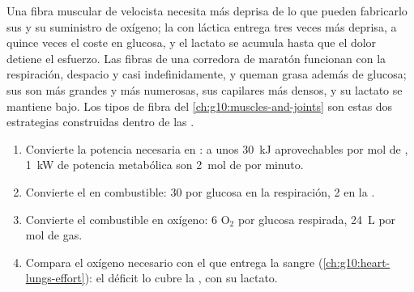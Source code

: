 \begin{example}\label{ex:g12:respiration-fermentation:muscle}
Una fibra muscular de velocista necesita  más deprisa de lo que
pueden fabricarlo sus  y su suministro de oxígeno; la
 con  láctica entrega  tres veces más deprisa,
a quince veces el coste en glucosa, y el lactato se acumula hasta que
el dolor detiene el esfuerzo. Las fibras de una corredora de maratón
funcionan con la respiración, despacio y casi indefinidamente, y queman
grasa además de glucosa; sus  son más grandes y más
numerosas, sus capilares más densos, y su lactato se mantiene bajo. Los
tipos de fibra del \cref{ch:g10:muscles-and-joints} son estas dos
estrategias construidas dentro de las .
\end{example}

\begin{method}\label{met:g12:respiration-fermentation:budget}
\begin{enumerate}
  \item Convierte la potencia necesaria en : a unos \qty{30}{kJ}
        aprovechables por mol de , \qty{1}{kW} de potencia
        metabólica son \qty{2}{mol} de  por minuto.
  \item Convierte el  en combustible: 30  por glucosa en la
        respiración, 2 en la .
  \item Convierte el combustible en oxígeno: 6 $\mathrm{O_2}$ por
        glucosa respirada, \qty{24}{L} por mol de gas.
  \item Compara el oxígeno necesario con el que entrega la sangre
        (\cref{ch:g10:heart-lungs-effort}): el déficit lo cubre la
        , con su lactato.
\end{enumerate}
\end{method}

